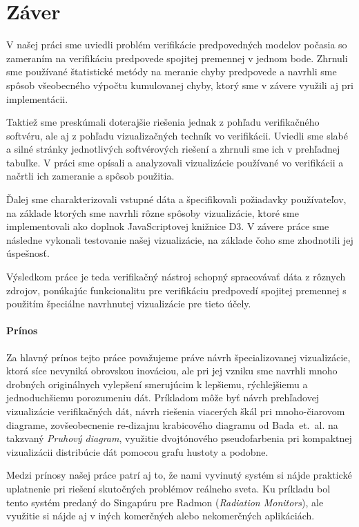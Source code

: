 \chapter*{Záver}

V našej práci sme uviedli problém verifikácie predpovedných modelov počasia so zameraním na verifikáciu predpovede spojitej premennej v jednom bode. Zhrnuli sme používané štatistické metódy na meranie chyby predpovede a navrhli sme spôsob všeobecného výpočtu kumulovanej chyby, ktorý sme v závere využili aj pri implementácii.

Taktiež sme preskúmali doterajšie riešenia jednak z pohľadu verifikačného softvéru, ale aj z pohľadu vizualizačných techník vo verifikácii. Uviedli sme slabé a silné stránky jednotlivých softvérových riešení a zhrnuli sme ich v prehľadnej tabuľke. V práci sme opísali a analyzovali vizualizácie používané vo verifikácii a načrtli ich zameranie a spôsob použitia.

Ďalej sme charakterizovali vstupné dáta a špecifikovali požiadavky používateľov, na základe ktorých sme navrhli rôzne spôsoby vizualizácie, ktoré sme implementovali ako doplnok JavaScriptovej knižnice D3. V závere práce sme následne vykonali testovanie našej vizualizácie, na základe čoho sme zhodnotili jej úspešnosť.

Výsledkom práce je teda verifikačný nástroj schopný spracovávať dáta z rôznych zdrojov, ponúkajúc funkcionalitu pre verifikáciu predpovedí spojitej premennej s použitím špeciálne navrhnutej vizualizácie pre tieto účely. 

\subsubsection{Prínos}

Za hlavný prínos tejto práce považujeme práve návrh špecializovanej vizualizácie, ktorá síce nevyniká obrovskou inováciou, ale pri jej vzniku sme navrhli mnoho drobných originálnych vylepšení smerujúcim k lepšiemu, rýchlejšiemu a jednoduchšiemu porozumeniu dát. Príkladom môže byť návrh prehľadovej vizualizácie verifikačných dát, návrh riešenia viacerých škál pri \mbox{mnoho-čiarovom} diagrame, zovšeobecnenie re-dizajnu krabicového diagramu od \mbox{Bada et. al.} \cite{Bade} na takzvaný \textit{Pruhový diagram}, využitie dvojtónového pseudofarbenia pri kompaktnej vizualizácii distribúcie dát pomocou grafu hustoty a podobne.

Medzi prínosy našej práce patrí aj to, že nami vyvinutý systém si nájde praktické uplatnenie pri riešení skutočných problémov reálneho sveta. Ku príkladu bol tento systém predaný do Singapúru pre Radmon (\textit{Radiation Monitors}), ale využitie si nájde aj v iných komerčných alebo nekomerčných aplikáciách.

